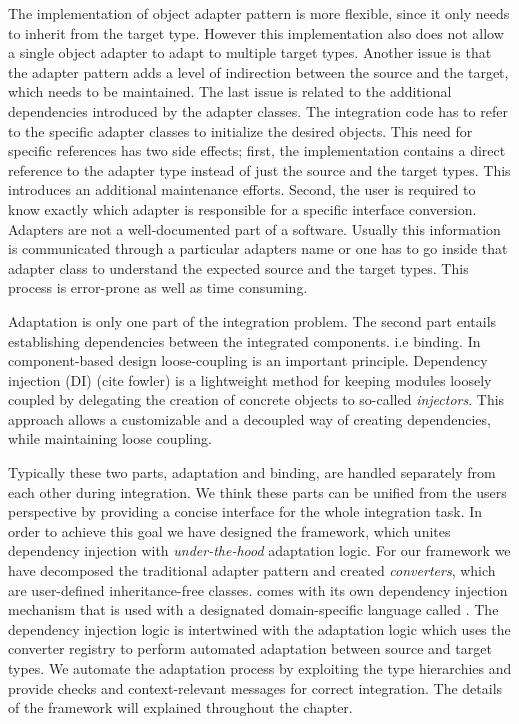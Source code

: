 The implementation of object adapter pattern is more flexible, since it only needs to inherit from the target type. 
However this implementation also does not allow a single object adapter to adapt to multiple target types. 
Another issue is that the adapter pattern adds a level of indirection between the source and the target, which needs to be maintained. 
The last issue is related to the additional dependencies introduced by the adapter classes. 
The integration code has to refer to the specific adapter classes to initialize the desired objects. 
This need for specific references has two side effects; first, the implementation contains a direct reference to the adapter type instead of just the source and the target types. This introduces an additional maintenance efforts. 
Second, the user is required to know exactly which adapter is responsible for a specific interface conversion.
Adapters are not a well-documented part of  a software.
Usually this information is communicated through a particular adapters name or one has to go inside that adapter class to understand the expected source and the target types. 
This process is error-prone as well as time consuming.

Adaptation is only one part of the integration problem. 
The second part entails establishing dependencies between the integrated components. i.e binding. 
In component-based design loose-coupling is an important principle.  
Dependency injection (DI) (cite fowler) is a lightweight method for keeping modules loosely coupled by delegating the creation of concrete objects to so-called \emph{injectors}. 
This approach allows a customizable and a decoupled way of creating dependencies, while maintaining loose coupling.

Typically these two parts, adaptation and binding, are handled separately from each other during integration. 
We think these parts can be unified from the users perspective by providing a concise interface for the whole integration task.
In order to achieve this goal we have designed the \zamk framework, which unites dependency injection with \emph{under-the-hood} adaptation logic.
For our framework we have decomposed the traditional adapter pattern and created \emph{converters}, which are user-defined inheritance-free classes. 
\zamk comes with its own dependency injection mechanism that is used with a designated domain-specific language called \gluer. 
The dependency injection logic is intertwined with the adaptation logic which uses the converter registry to perform automated adaptation between source and target types. 
We automate the adaptation process by exploiting the type hierarchies and provide checks and context-relevant messages for correct integration. The details of the framework will explained throughout the chapter.

